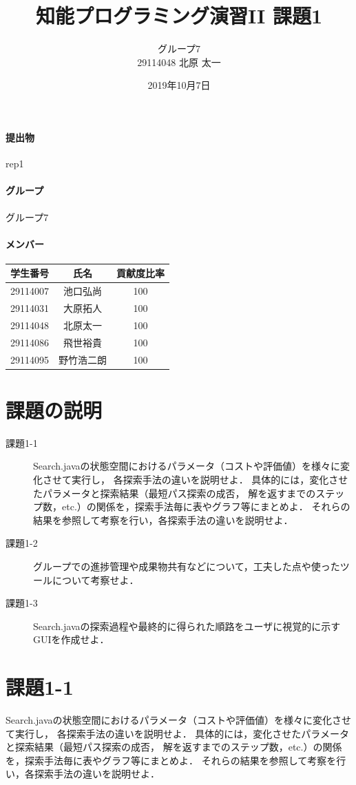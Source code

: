 \documentclass{jarticle}
\title{知能プログラミング演習II 課題1}
\author{グループ7\\
  29114048 北原 太一\\
}
\date{2019年10月7日}
\begin{document}
\maketitle

\paragraph{提出物} rep1
\paragraph{グループ} グループ7
\paragraph{メンバー}
\begin{tabular}{|c|c|c|}
  \hline
  学生番号&氏名&貢献度比率\\
  \hline\hline
  29114007&池口弘尚&100\\
  \hline
  29114031&大原拓人&100\\
  \hline
  29114048&北原太一&100\\
  \hline
  29114086&飛世裕貴&100\\
  \hline
  29114095&野竹浩二朗&100\\
  \hline
\end{tabular}

\section{課題の説明}
\begin{description}
\item[課題1-1] Search.javaの状態空間におけるパラメータ（コストや評価値）を様々に変化させて実行し，
  各探索手法の違いを説明せよ．
  具体的には，変化させたパラメータと探索結果（最短パス探索の成否，
  解を返すまでのステップ数，etc.）の関係を，探索手法毎に表やグラフ等にまとめよ．
  それらの結果を参照して考察を行い，各探索手法の違いを説明せよ．
\item[課題1-2] グループでの進捗管理や成果物共有などについて，工夫した点や使ったツールについて考察せよ．
\item[課題1-3] Search.javaの探索過程や最終的に得られた順路をユーザに視覚的に示すGUIを作成せよ．
\end{description}


\section{課題1-1}
\begin{screen}
  Search.javaの状態空間におけるパラメータ（コストや評価値）を様々に変化させて実行し，
  各探索手法の違いを説明せよ．
  具体的には，変化させたパラメータと探索結果（最短パス探索の成否，
  解を返すまでのステップ数，etc.）の関係を，探索手法毎に表やグラフ等にまとめよ．
  それらの結果を参照して考察を行い，各探索手法の違いを説明せよ．
\end{screen}
\end{document}
